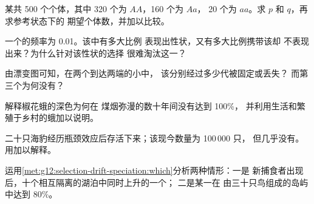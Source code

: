 \begin{exercise}[$\star\star$]\label{exo:g12:selection-drift-speciation:6}
某共 500 个个体，其中 320 个为 $AA$，160 个为 $Aa$，
20 个为 $aa$。求 $p$ 和 $q$，再求参考状态下的
期望个体数，并加以比较。
\end{exercise}

\begin{exercise}[$\star\star$]\label{exo:g12:selection-drift-speciation:7}
一个的频率为 0.01。该中有多大比例
表现出性状，又有多大比例携带该却
不表现出来？为什么针对该性状的选择
很难淘汰这一？
\end{exercise}

\begin{exercise}[$\star\star$]\label{exo:g12:selection-drift-speciation:8}
由漂变图可知，在两个到达两端的小中，
该分别经过多少代被固定或丢失？
而第三个为何没有？
\end{exercise}

\begin{exercise}[$\star\star$]\label{exo:g12:selection-drift-speciation:9}
解释椒花蛾的深色为何在
煤烟弥漫的数十年间没有达到 100\%，
并利用生活和繁殖于乡村的蛾加以说明。
\end{exercise}

\begin{exercise}[$\star\star$]\label{exo:g12:selection-drift-speciation:10}
二十只海豹经历瓶颈效应后存活下来；该现今数量为 100\,000 只，
但几乎没有。用加以解释。
\end{exercise}

\begin{exercise}[$\star\star$]\label{exo:g12:selection-drift-speciation:11}
运用\cref{met:g12:selection-drift-speciation:which}分析两种情形：一是
新捕食者出现后，十个相互隔离的湖泊中同时上升的一个；
二是某一在
由三十只鸟组成的岛屿中达到 80\%。
\end{exercise}

